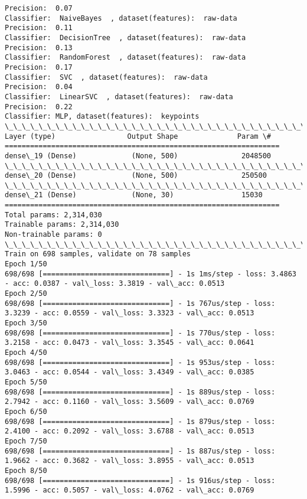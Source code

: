 \documentclass[11pt]{article}
\begin{document}
    \begin{Verbatim}[commandchars=\\\{\}]
Precision:  0.07
Classifier:  NaiveBayes  , dataset(features):  raw-data
Precision:  0.11
Classifier:  DecisionTree  , dataset(features):  raw-data
Precision:  0.13
Classifier:  RandomForest  , dataset(features):  raw-data
Precision:  0.17
Classifier:  SVC  , dataset(features):  raw-data
Precision:  0.04
Classifier:  LinearSVC  , dataset(features):  raw-data
Precision:  0.22
Classifier: MLP, dataset(features):  keypoints
\_\_\_\_\_\_\_\_\_\_\_\_\_\_\_\_\_\_\_\_\_\_\_\_\_\_\_\_\_\_\_\_\_\_\_\_\_\_\_\_\_\_\_\_\_\_\_\_\_\_\_\_\_\_\_\_\_\_\_\_\_\_\_\_\_
Layer (type)                 Output Shape              Param \#   
=================================================================
dense\_19 (Dense)             (None, 500)               2048500   
\_\_\_\_\_\_\_\_\_\_\_\_\_\_\_\_\_\_\_\_\_\_\_\_\_\_\_\_\_\_\_\_\_\_\_\_\_\_\_\_\_\_\_\_\_\_\_\_\_\_\_\_\_\_\_\_\_\_\_\_\_\_\_\_\_
dense\_20 (Dense)             (None, 500)               250500    
\_\_\_\_\_\_\_\_\_\_\_\_\_\_\_\_\_\_\_\_\_\_\_\_\_\_\_\_\_\_\_\_\_\_\_\_\_\_\_\_\_\_\_\_\_\_\_\_\_\_\_\_\_\_\_\_\_\_\_\_\_\_\_\_\_
dense\_21 (Dense)             (None, 30)                15030     
=================================================================
Total params: 2,314,030
Trainable params: 2,314,030
Non-trainable params: 0
\_\_\_\_\_\_\_\_\_\_\_\_\_\_\_\_\_\_\_\_\_\_\_\_\_\_\_\_\_\_\_\_\_\_\_\_\_\_\_\_\_\_\_\_\_\_\_\_\_\_\_\_\_\_\_\_\_\_\_\_\_\_\_\_\_
Train on 698 samples, validate on 78 samples
Epoch 1/50
698/698 [==============================] - 1s 1ms/step - loss: 3.4863 - acc: 0.0387 - val\_loss: 3.3819 - val\_acc: 0.0513
Epoch 2/50
698/698 [==============================] - 1s 767us/step - loss: 3.3239 - acc: 0.0559 - val\_loss: 3.3323 - val\_acc: 0.0513
Epoch 3/50
698/698 [==============================] - 1s 770us/step - loss: 3.2158 - acc: 0.0473 - val\_loss: 3.3545 - val\_acc: 0.0641
Epoch 4/50
698/698 [==============================] - 1s 953us/step - loss: 3.0463 - acc: 0.0544 - val\_loss: 3.4349 - val\_acc: 0.0385
Epoch 5/50
698/698 [==============================] - 1s 889us/step - loss: 2.7942 - acc: 0.1160 - val\_loss: 3.5609 - val\_acc: 0.0769
Epoch 6/50
698/698 [==============================] - 1s 879us/step - loss: 2.4100 - acc: 0.2092 - val\_loss: 3.6788 - val\_acc: 0.0513
Epoch 7/50
698/698 [==============================] - 1s 887us/step - loss: 1.9662 - acc: 0.3682 - val\_loss: 3.8955 - val\_acc: 0.0513
Epoch 8/50
698/698 [==============================] - 1s 916us/step - loss: 1.5996 - acc: 0.5057 - val\_loss: 4.0762 - val\_acc: 0.0769

\end{Verbatim}
\end{document}
